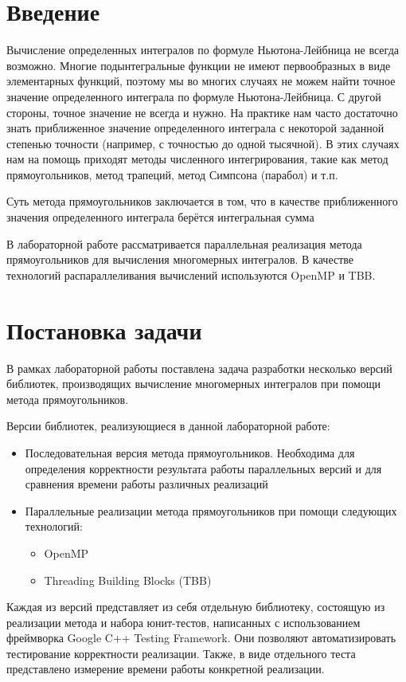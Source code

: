 \documentclass{report}
\begin{document}
\setcounter{page}{2}

\tableofcontents
\newpage

\section*{Введение}
Вычисление определенных интегралов по формуле Ньютона-Лейбница не всегда возможно. Многие подынтегральные функции не имеют первообразных в виде элементарных функций, поэтому мы во многих случаях не можем найти точное значение определенного интеграла по формуле Ньютона-Лейбница. С другой стороны, точное значение не всегда и нужно. На практике нам часто достаточно знать приближенное значение определенного интеграла с некоторой заданной степенью точности (например, с точностью до одной тысячной). В этих случаях нам на помощь приходят методы численного интегрирования, такие как метод прямоугольников, метод трапеций, метод Симпсона (парабол) и т.п.
\par Суть метода прямоугольников заключается в том, что в качестве приближенного значения определенного интеграла берётся интегральная сумма
\par В лабораторной работе рассматривается параллельная реализация метода прямоугольников для вычисления многомерных интегралов. В качестве технологий распараллеливания вычислений используются OpenMP и TBB.
\newpage

\section*{Постановка задачи}
В рамках лабораторной работы поставлена задача разработки несколько версий библиотек, производящих вычисление многомерных интегралов при помощи метода прямоугольников.
\par Версии библиотек, реализующиеся в данной лабораторной работе:
\begin{itemize}
\item Последовательная версия метода прямоугольников. Необходима для определения корректности результата работы параллельных версий и для сравнения времени работы различных реализаций
\item Параллельные реализации метода прямоугольников при помощи следующих технологий:
    \begin{itemize}
    \item OpenMP
    \item Threading Building Blocks (TBB)
    \end{itemize}
\end{itemize}
\par Каждая из версий представляет из себя отдельную библиотеку, состоящую из реализации метода и набора юнит-тестов, написанных с использованием фреймворка Google C++ Testing Framework. Они позволяют автоматизировать тестирование корректности реализации. Также, в виде отдельного теста представлено измерение времени работы конкретной реализации.
\newpage
\end{document}
